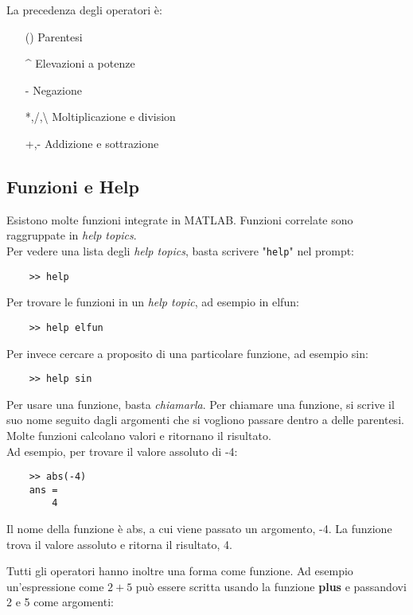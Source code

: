 \documentclass[a4paper, 10pt]{article}
\begin{document}
\bigskip\noindent
La precedenza degli operatori è:

\begin{itemize}
\item[()] Parentesi
\item[\textasciicircum] Elevazioni a potenze
\item[-] Negazione
\item[*,/,\textbackslash] Moltiplicazione e division
\item[+,-] Addizione e sottrazione
\end{itemize}

\subsection{Funzioni e Help}
Esistono molte funzioni integrate in MATLAB. Funzioni correlate sono raggruppate in \textit{help topics}.\\
Per vedere una lista degli \textit{help topics}, basta scrivere "\lstinline|help|" nel prompt:

	\begin{lstlisting}
	>> help
	\end{lstlisting}
Per trovare le funzioni in un \textit{help topic}, ad esempio in elfun:

	\begin{lstlisting}
	>> help elfun
	\end{lstlisting}
Per invece cercare a proposito di una particolare funzione, ad esempio sin:

	\begin{lstlisting}
	>> help sin
	\end{lstlisting}
Per usare una funzione, basta \textit{chiamarla}.
Per chiamare una funzione, si scrive il suo nome seguito dagli argomenti che si vogliono passare dentro a delle parentesi. 
Molte funzioni calcolano valori e ritornano il risultato.\\
Ad esempio, per trovare il valore assoluto di -4:

	\begin{lstlisting}
	>> abs(-4)
	ans =
		4
	\end{lstlisting}

Il nome della funzione è abs, a cui viene passato un argomento, -4. La funzione trova il valore assoluto e ritorna il risultato, 4.

Tutti gli operatori hanno inoltre una forma come funzione. Ad esempio un'espressione come $2+5$ può essere scritta usando la funzione \textbf{plus} e passandovi 2 e 5 come argomenti:
\end{document}
